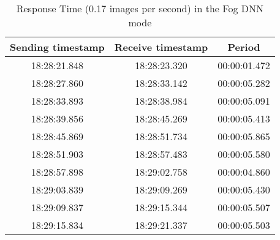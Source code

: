 \begin{table}[h!]
\centering
\begin{tabular}{ |c|c|c| } 
 \hline
 Sending timestamp &    Receive timestamp &    Period\\
 \hline
 
18:28:21.848 &	18:28:23.320 &	00:00:01.472\\
18:28:27.860 &	18:28:33.142 &	00:00:05.282\\
18:28:33.893 &	18:28:38.984 &	00:00:05.091\\
18:28:39.856 &	18:28:45.269 &	00:00:05.413\\
18:28:45.869 &	18:28:51.734 &	00:00:05.865\\
18:28:51.903 &	18:28:57.483 &	00:00:05.580\\
18:28:57.898 &	18:29:02.758 &	00:00:04.860\\
18:29:03.839 &	18:29:09.269 &	00:00:05.430\\
18:29:09.837 &	18:29:15.344 &	00:00:05.507\\
18:29:15.834 &	18:29:21.337 &	00:00:05.503\\
 \hline
\end{tabular}
\caption{Response Time (0.17 images per second) in the Fog DNN mode}
\label{table:measure_response_time_dnn_6}
\end{table}
